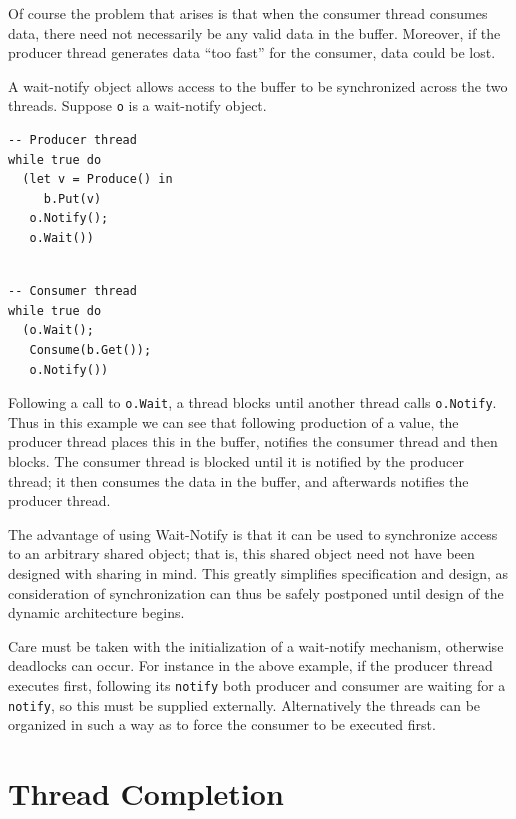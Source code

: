 \documentclass{overturerepchap}
\begin{document}
Of course the problem that arises is that when the consumer thread
consumes data, there need not necessarily be any valid data in the
buffer. Moreover, if the producer thread generates data ``too fast''
for the consumer, data could be lost.

A wait-notify object allows access to the buffer to be synchronized
across the two threads. Suppose \texttt{o} is a wait-notify object.

\begin{multicols}{2}
\begin{lstlisting}
-- Producer thread
while true do
  (let v = Produce() in
     b.Put(v)
   o.Notify();
   o.Wait())
\end{lstlisting}
\begin{lstlisting}

-- Consumer thread
while true do
  (o.Wait();
   Consume(b.Get());
   o.Notify())
\end{lstlisting}
\end{multicols}

Following a call to \texttt{o.Wait}, a thread blocks until another
thread calls \texttt{o.Notify}. Thus in this example we can see that
following production of a value, the producer thread places this in
the buffer, notifies the consumer thread and then blocks. The consumer
thread is blocked until it is notified by the producer thread; it then
consumes the data in the buffer, and afterwards notifies the producer
thread.

The advantage of using Wait-Notify is that it can be used to
synchronize access to an arbitrary shared object; that is, this shared
object need not have been designed with sharing in mind. This greatly
simplifies specification and design, as consideration of
synchronization can thus be safely postponed until design of the
dynamic architecture begins.

Care must be taken with the initialization of a wait-notify mechanism,
otherwise deadlocks can occur. For instance in the above example, if
the producer thread executes first, following its \texttt{notify} both
producer and consumer are waiting for a \texttt{notify}, so this must
be supplied externally. Alternatively the threads can be organized in
such a way as to force the consumer to be executed first.


\section{Thread Completion}
\end{document}
